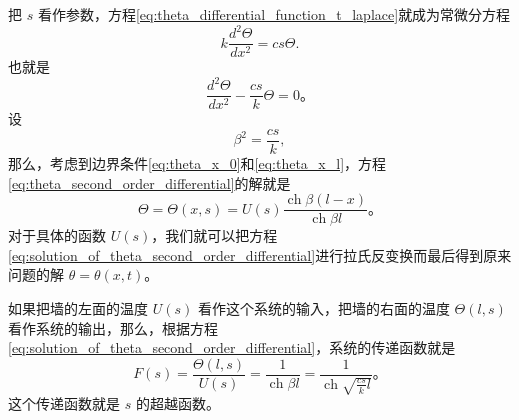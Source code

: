 把 $s$ 看作参数，方程\eqref{eq:theta_differential_function_t_laplace}就成为常微分方程
\begin{equation*}
k \frac{d^2 \Theta}{dx^2} = cs \Theta.
\end{equation*}
也就是
\begin{equation}\label{eq:theta_second_order_differential}
\frac{d^2 \Theta}{dx^2} - \frac{c s}{k} \Theta = 0。
\end{equation}
设
\begin{equation*}
\beta^2 = \frac{c s}{k},
\end{equation*}
那么，考虑到边界条件\eqref{eq:theta_x_0}和\eqref{eq:theta_x_l}，方程\eqref{eq:theta_second_order_differential}的解就是
\begin{equation}\label{eq:solution_of_theta_second_order_differential}
\Theta = \Theta(x,s) = U(s) \frac{\operatorname{ch} \beta (l - x)}{\operatorname{ch} \beta l}。
\end{equation}
对于具体的函数 $U(s)$，我们就可以把方程\eqref{eq:solution_of_theta_second_order_differential}进行拉氏反变换而最后得到原来问题的解 $\theta = \theta(x,t)$。

如果把墙的左面的温度 $U(s)$ 看作这个系统的输入，把墙的右面的温度 $\Theta(l,s)$ 看作系统的输出，那么，根据方程\eqref{eq:solution_of_theta_second_order_differential}，系统的传递函数就是
\begin{equation}
F(s) = \frac{\Theta(l,s)}{U(s)} = \frac{1}{\operatorname{ch} \beta l} = \frac{1}{\operatorname{ch} \sqrt{\frac{c s}{k} l}}。
\end{equation}
这个传递函数就是 $s$ 的超越函数。

